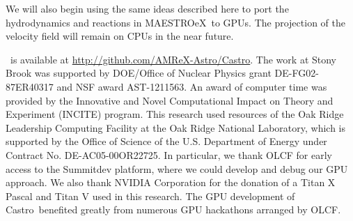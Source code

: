\documentclass[twocolumn,times]{aastex62}
\newcommand{\castro}{{\sf Castro}}
\newcommand{\maestroex}{{\sf MAESTROeX}}
\begin{document}
We will also begin using the same ideas described here to port the
hydrodynamics and reactions in \maestroex\ to GPUs.  The projection of
the velocity field will remain on CPUs in the near future.




\acknowledgements \castro\ is available at
\url{http://github.com/AMReX-Astro/Castro}.  The work at Stony Brook
was supported by DOE/Office of Nuclear Physics grant DE-FG02-87ER40317
and NSF award AST-1211563.  An award of computer time was provided by
the Innovative and Novel Computational Impact on Theory and Experiment
(INCITE) program.  This research used resources of the Oak Ridge
Leadership Computing Facility at the Oak Ridge National Laboratory,
which is supported by the Office of Science of the U.S. Department of
Energy under Contract No. DE-AC05-00OR22725.  In particular, we thank
OLCF for early access to the Summitdev platform, where we could
develop and debug our GPU approach.  We also thank NVIDIA Corporation
for the donation of a Titan X Pascal and Titan V used in this
research.  The GPU development of \castro\ benefited greatly from
numerous GPU hackathons arranged by OLCF.







\end{document}
